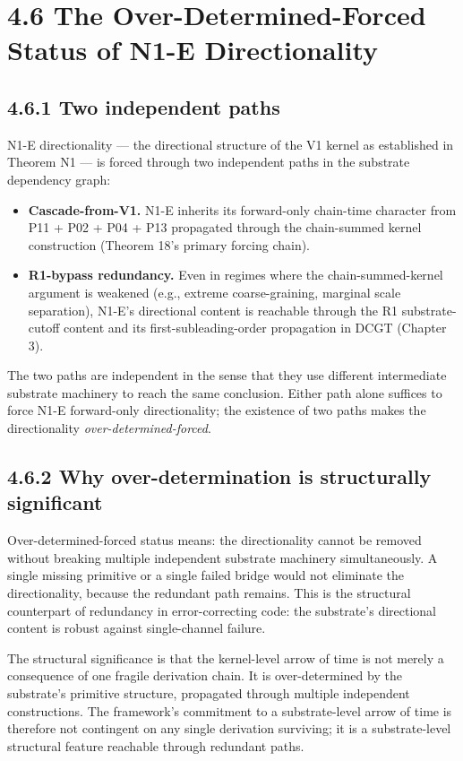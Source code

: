 \documentclass[11pt]{book}
\begin{document}
\section{4.6 The Over-Determined-Forced Status of N1-E Directionality}

\subsection{4.6.1 Two independent paths}

N1-E directionality — the directional structure of the V1 kernel as established in Theorem N1 — is forced through two independent paths in the substrate dependency graph:

\begin{itemize}
\item \textbf{Cascade-from-V1.} N1-E inherits its forward-only chain-time character from P11 + P02 + P04 + P13 propagated through the chain-summed kernel construction (Theorem 18's primary forcing chain).
\item \textbf{R1-bypass redundancy.} Even in regimes where the chain-summed-kernel argument is weakened (e.g., extreme coarse-graining, marginal scale separation), N1-E's directional content is reachable through the R1 substrate-cutoff content and its first-subleading-order propagation in DCGT (Chapter 3).
\end{itemize}

The two paths are independent in the sense that they use different intermediate substrate machinery to reach the same conclusion. Either path alone suffices to force N1-E forward-only directionality; the existence of two paths makes the directionality \textit{over-determined-forced}.

\subsection{4.6.2 Why over-determination is structurally significant}

Over-determined-forced status means: the directionality cannot be removed without breaking multiple independent substrate machinery simultaneously. A single missing primitive or a single failed bridge would not eliminate the directionality, because the redundant path remains. This is the structural counterpart of redundancy in error-correcting code: the substrate's directional content is robust against single-channel failure.

The structural significance is that the kernel-level arrow of time is not merely a consequence of one fragile derivation chain. It is over-determined by the substrate's primitive structure, propagated through multiple independent constructions. The framework's commitment to a substrate-level arrow of time is therefore not contingent on any single derivation surviving; it is a substrate-level structural feature reachable through redundant paths.
\end{document}
